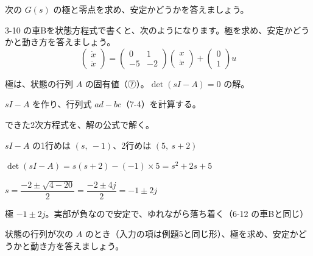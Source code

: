 \begin{jibun}
次の $G(s)$ の極と零点を求め、安定かどうかを答えましょう。
\end{jibun}

\begin{reidai}[状態方程式から極を求める]
3-10 の車Bを状態方程式で書くと、次のようになります。極を求め、安定かどうかと動き方を答えましょう。
\[ \begin{pmatrix}\dot x\\\ddot x\end{pmatrix}=\begin{pmatrix}0&1\\-5&-2\end{pmatrix}\begin{pmatrix}x\\\dot x\end{pmatrix}+\begin{pmatrix}0\\1\end{pmatrix}u \]
\kangaekata {}\par
{}\enspace 極は、状態の行列 $A$ の固有値（⑦）。$\det(sI-A)=0$ の解。\par
{}\enspace $sI-A$ を作り、行列式 $ad-bc$（7-4）を計算する。\par
{}\enspace できた2次方程式を、解の公式で解く。\par
\shiki\kixjs{}\zw{} $sI-A$ の1行めは $(s,\ -1)$、2行めは $(5,\ s+2)$\par
\kixja $\det(sI-A)=s(s+2)-(-1)\times5=s^2+2s+5$\par
\kixja $s=\dfrac{-2\pm\sqrt{4-20}}{2}=\dfrac{-2\pm4j}{2}=-1\pm2j$\par
\kotae\kixjs{}\zw{} 極 $-1\pm2j$。実部が負なので安定で、ゆれながら落ち着く（6-12 の車Bと同じ）
\end{reidai}

\begin{jibun}
状態の行列が次の $A$ のとき（入力の項は例題5と同じ形）、極を求め、安定かどうかと動き方を答えましょう。
\end{jibun}

